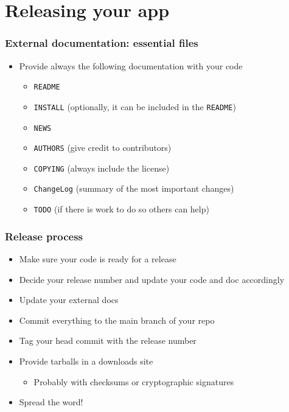\documentclass[11pt]{beamer}
\begin{document}
\section{Releasing your app}
\label{sec-4}
\begin{frame}[fragile]\frametitle{External documentation: essential files}
\label{sec-4_1}


\begin{itemize}
\item Provide always the following documentation with your code

\begin{itemize}
\item \texttt{README}
\item \texttt{INSTALL} (optionally, it can be included in the \texttt{README})
\item \texttt{NEWS}
\item \texttt{AUTHORS} (give credit to contributors)
\item \texttt{COPYING} (always include the license)
\item \texttt{ChangeLog} (summary of the most important changes)
\item \texttt{TODO} (if there is work to do so others can help)
\end{itemize}

\end{itemize}
\end{frame}
\begin{frame}[fragile]\frametitle{Release process}
\label{sec-4_2}


\begin{itemize}
\item Make sure your code is ready for a release
\item Decide your release number and update your code and doc accordingly
\item Update your external docs
\item Commit everything to the main branch of your repo
\item Tag your head commit with the release number
\item Provide tarballs in a downloads site

\begin{itemize}
\item Probably with checksums or cryptographic signatures
\end{itemize}

\item Spread the word!
\end{itemize}
\end{frame}
\end{document}

